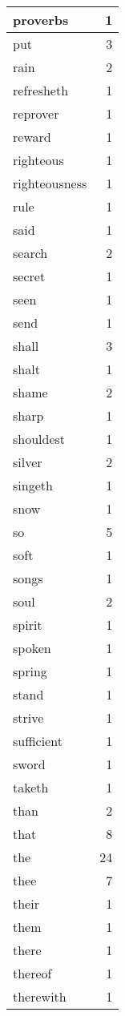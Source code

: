 \begin{center}
\begin{longtable}{l|r}
proverbs & 1\\ \hline 
put & 3\\ \hline 
rain & 2\\ \hline 
refresheth & 1\\ \hline 
reprover & 1\\ \hline 
reward & 1\\ \hline 
righteous & 1\\ \hline 
righteousness & 1\\ \hline 
rule & 1\\ \hline 
said & 1\\ \hline 
search & 2\\ \hline 
secret & 1\\ \hline 
seen & 1\\ \hline 
send & 1\\ \hline 
shall & 3\\ \hline 
shalt & 1\\ \hline 
shame & 2\\ \hline 
sharp & 1\\ \hline 
shouldest & 1\\ \hline 
silver & 2\\ \hline 
singeth & 1\\ \hline 
snow & 1\\ \hline 
so & 5\\ \hline 
soft & 1\\ \hline 
songs & 1\\ \hline 
soul & 2\\ \hline 
spirit & 1\\ \hline 
spoken & 1\\ \hline 
spring & 1\\ \hline 
stand & 1\\ \hline 
strive & 1\\ \hline 
sufficient & 1\\ \hline 
sword & 1\\ \hline 
taketh & 1\\ \hline 
than & 2\\ \hline 
that & 8\\ \hline 
the & 24\\ \hline 
thee & 7\\ \hline 
their & 1\\ \hline 
them & 1\\ \hline 
there & 1\\ \hline 
thereof & 1\\ \hline 
therewith & 1\\ \hline 

\end{longtable}
\end{center}
